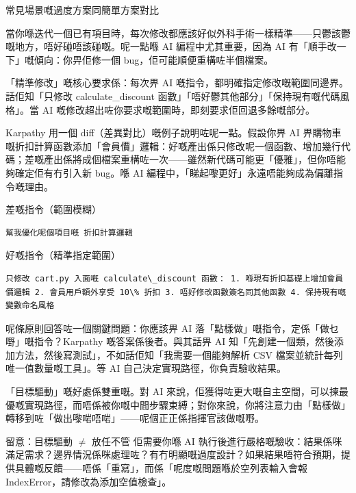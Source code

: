 \begin{center}\small\color{gray}常見場景嘅過度方案同簡單方案對比\end{center}


當你喺迭代一個已有項目時，每次修改都應該好似外科手術一樣精準——只鬱該鬱嘅地方，唔好碰唔該碰嘅。呢一點喺 AI 編程中尤其重要，因為 AI 有「順手改一下」嘅傾向：你畀佢修一個 bug，佢可能順便重構咗半個檔案。

「精準修改」嘅核心要求係：每次畀 AI 嘅指令，都明確指定修改嘅範圍同邊界。話佢知「只修改 calculate\_discount 函數」「唔好鬱其他部分」「保持現有嘅代碼風格」。當 AI 嘅修改超出咗你要求嘅範圍時，即刻要求佢回退多餘嘅部分。

Karpathy 用一個 diff（差異對比）嘅例子說明咗呢一點。假設你畀 AI 畀購物車嘅折扣計算函數添加「會員價」邏輯：好嘅產出係只修改呢一個函數、增加幾行代碼；差嘅產出係將成個檔案重構咗一次——雖然新代碼可能更「優雅」，但你唔能夠確定佢有冇引入新 bug。喺 AI 編程中，「睇起嚟更好」永遠唔能夠成為偏離指令嘅理由。

差嘅指令（範圍模糊）

\begin{lstlisting}
幫我優化呢個項目嘅 折扣計算邏輯
\end{lstlisting}

好嘅指令（精準指定範圍）

\begin{lstlisting}
只修改 cart.py 入面嘅 calculate\_discount 函數： 1. 喺現有折扣基礎上增加會員價邏輯 2. 會員用戶額外享受 10\% 折扣 3. 唔好修改函數簽名同其他函數 4. 保持現有嘅變數命名風格
\end{lstlisting}


呢條原則回答咗一個關鍵問題：你應該畀 AI 落「點樣做」嘅指令，定係「做乜嘢」嘅指令？Karpathy 嘅答案係後者。與其話畀 AI 知「先創建一個類，然後添加方法，然後寫測試」，不如話佢知「我需要一個能夠解析 CSV 檔案並統計每列唯一值數量嘅工具」。等 AI 自己決定實現路徑，你負責驗收結果。

「目標驅動」嘅好處係雙重嘅。對 AI 來說，佢獲得咗更大嘅自主空間，可以揀最優嘅實現路徑，而唔係被你嘅中間步驟束縛；對你來說，你將注意力由「點樣做」轉移到咗「做出嚟啱唔啱」——呢個正正係指揮官該做嘅嘢。

\begin{tcbwarn}{留意：目標驅動 $\neq$ 放任不管}
佢需要你喺 AI 執行後進行嚴格嘅驗收：結果係咪滿足需求？邊界情況係咪處理咗？有冇明顯嘅過度設計？如果結果唔符合預期，提供具體嘅反饋——唔係「重寫」，而係「呢度嘅問題喺於空列表輸入會報 IndexError，請修改為添加空值檢查」。

\end{tcbwarn}

